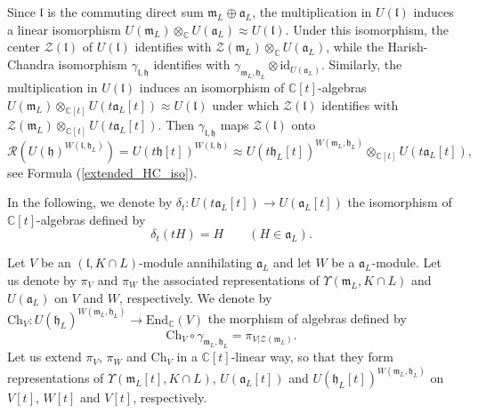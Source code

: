 \documentclass{amsart}
\theoremstyle{definition}
\begin{document}
Since $\mathfrak{l}$ is the commuting direct sum $\mathfrak{m}_L \oplus \mathfrak{a}_L$, the multiplication in $U(\mathfrak{l})$ induces a linear isomorphism $U(\mathfrak{m}_L)\otimes_\mathbb{C} U(\mathfrak{a}_L) \approx U(\mathfrak{l})$. Under this isomorphism, the center $\mathcal{Z}(\mathfrak{l})$ of $U(\mathfrak{l})$ identifies with $\mathcal{Z}(\mathfrak{m}_L) \otimes_\mathbb{C} U(\mathfrak{a}_L)$, while the Harish-Chandra isomorphism \(\gamma_{\mathfrak{l},\mathfrak{h}}\) identifies with $\gamma_{\mathfrak{m}_L,\mathfrak{h}_L} \otimes \mathrm{id}_{U(\mathfrak{a}_L)}$.
Similarly, the multiplication in $U(\bm{\mathfrak{l}})$ induces an isomorphism of $\mathbb{C}[t]$-algebras $U(\bm{\mathfrak{m}}_L) \otimes_{\mathbb{C}[t]}U(t\mathfrak{a}_L[t]) \approx U(\bm{\mathfrak{l}})$ under which $\mathcal{Z}(\bm{\mathfrak{l}})$ identifies with $\mathcal{Z}(\bm{\mathfrak{m}}_L) \otimes_{\mathbb{C}[t]}U(t\mathfrak{a}_L[t])$. Then $\gamma_{\mathfrak{l},\mathfrak{h}}$ maps $\mathcal{Z}(\bm{\mathfrak{l}})$ onto 
\begin{equation} \label{isomorphism_UhW}
    \mathcal{R}\left(U(\mathfrak{h})^{W(\mathfrak{l},\mathfrak{h}_L)}\right) = U(t\mathfrak{h}[t])^{W(\mathfrak{l},\mathfrak{h})} \approx U(t\mathfrak{h}_L[t])^{W(\mathfrak{m}_L,\mathfrak{h}_L)} \otimes_{\mathbb{C}[t]} U(t\mathfrak{a}_L[t]),
\end{equation}
see Formula (\ref{extended_HC_iso}).

In the following, we denote by $\delta_t : U(t\mathfrak{a}_L[t]) \to U(\mathfrak{a}_L[t])$ the isomorphism of $\mathbb{C}[t]$-algebras defined by
\begin{equation*}
    \delta_t(tH) = H\qquad (H \in \mathfrak{a}_L).
\end{equation*}

Let $V$ be an $(\mathfrak{l},K\cap L)$-module annihilating $\mathfrak{a}_L$ and let $W$ be a $\mathfrak{a}_L$-module. Let us denote by $\pi_V$ and $\pi_W$ the associated representations of $\Upsilon(\mathfrak{m}_L,K\cap L)$ and $U(\mathfrak{a}_L)$ on $V$ and $W$, respectively. We denote by $\mathrm{Ch}_V : U(\mathfrak{h}_L)^{W(\mathfrak{m}_L,\mathfrak{h}_L)} \to \mathrm{End}_\mathbb{C}(V)$ the morphism of algebras defined by
\begin{equation*}
    \mathrm{Ch}_V \circ \gamma_{\mathfrak{m}_L,\mathfrak{h}_L} = \pi_{V|\mathcal{Z}(\mathfrak{m}_L)}.
\end{equation*}
Let us extend $\pi_V$, $\pi_W$ and $\mathrm{Ch}_V$ in a $\mathbb{C}[t]$-linear way, so that they form representations of $\Upsilon(\mathfrak{m}_L[t],K\cap L)$, $U(\mathfrak{a}_L[t])$ and $U(\mathfrak{h}_L[t])^{W(\mathfrak{m}_L,\mathfrak{h}_L)}$ on $V[t]$, $W[t]$ and $V[t]$, respectively.
\end{document}
